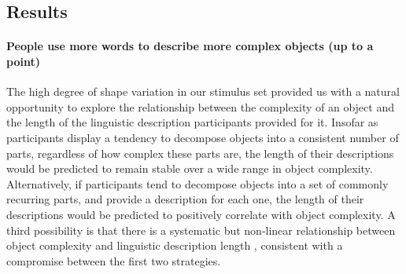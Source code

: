 \subsection{Results}

\paragraph{People use more words to describe more complex objects (up to a point)}
The high degree of shape variation in our stimulus set provided us with a natural opportunity to explore the relationship between the complexity of an object and the length of the linguistic description participants provided for it.
Insofar as participants display a tendency to decompose objects into a consistent number of parts, regardless of how complex these parts are, the length of their descriptions would be predicted to remain stable over a wide range in object complexity. 
Alternatively, if participants tend to decompose objects into a set of commonly recurring parts, and provide a description for each one, the length of their descriptions would be predicted to positively correlate with object complexity. 
A third possibility is that there is a systematic but non-linear relationship between object complexity and linguistic description length \cite{sun2021seeing}, consistent with a compromise between the first two strategies. 
